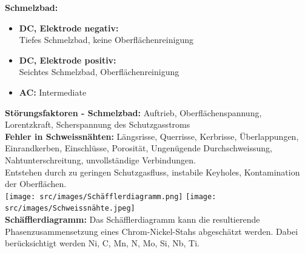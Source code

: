 \textbf{Schmelzbad:} 
\begin{itemize}
    \item \textbf{DC, Elektrode negativ:} \\Tiefes Schmelzbad, keine Oberflächenreinigung
    \item \textbf{DC, Elektrode positiv:} \\Seichtes Schmelzbad, Oberflächenreinigung
    \item \textbf{AC:} Intermediate
\end{itemize}

\textbf{Störungsfaktoren - Schmelzbad:} Auftrieb, Oberflächenspannung, Lorentzkraft, Scherspannung des Schutzgasstroms\\

\textbf{Fehler in Schweissnähten:} Längsrisse, Querrisse, Kerbrisse, 
Überlappungen, Einrandkerben, Einschlüsse, Porosität, Ungenügende 
Durchschweissung, Nahtunterschreitung, unvollständige Verbindungen. \\
Entstehen durch zu geringen Schutzgasfluss, instabile Keyholes, 
Kontamination der Oberflächen.\\
\texttt{[image: src/images/Schäfflerdiagramm.png]}
\texttt{[image: src/images/Schweissnähte.jpeg]}\\


\textbf{Schäfflerdiagramm:} Das Schäfflerdiagramm kann die resultierende 
Phasenzusammensetzung eines Chrom-Nickel-Stahs abgeschätzt werden. 
Dabei berücksichtigt werden Ni, C, Mn, N, Mo, Si, Nb, Ti.\\





